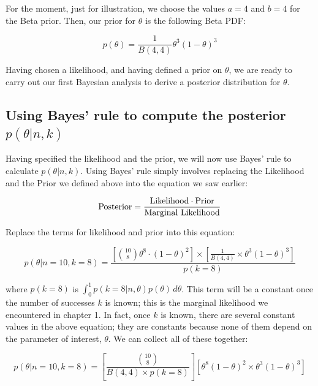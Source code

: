 \documentclass[12pt,]{krantz}
\theoremstyle{definition}
\theoremstyle{definition}
\theoremstyle{definition}
\theoremstyle{remark}
\begin{document}
For the moment, just for illustration, we choose the values \(a=4\) and \(b=4\) for the Beta prior. Then, our prior for \(\theta\) is the following Beta PDF:

\begin{equation}
p(\theta) = \frac{1}{B(4,4)} \theta^{3} (1-\theta)^{3}
\end{equation}

Having chosen a likelihood, and having defined a prior on \(\theta\), we are ready to carry out our first Bayesian analysis to derive a posterior distribution for \(\theta\).

\hypertarget{using-bayes-rule-to-compute-the-posterior-pthetank}{%
\subsection{\texorpdfstring{Using Bayes' rule to compute the posterior \(p(\theta|n,k)\)}{Using Bayes' rule to compute the posterior p(\textbackslash{}theta\textbar{}n,k)}}\label{using-bayes-rule-to-compute-the-posterior-pthetank}}

Having specified the likelihood and the prior, we will now use Bayes' rule to calculate \(p(\theta|n,k)\). Using Bayes' rule simply involves replacing the Likelihood and the Prior we defined above into the equation we saw earlier:

\begin{equation}
\hbox{Posterior} = \frac{\hbox{Likelihood} \cdot \hbox{Prior}}{\hbox{Marginal Likelihood}}
\end{equation}

Replace the terms for likelihood and prior into this equation:

\begin{equation}
p(\theta|n=10,k=8) = \frac{\left[\binom{10}{8} \theta^8 \cdot (1-\theta)^{2}\right]  \times \left[\frac{1}{B(4,4)} \times \theta^{3} (1-\theta)^{3}\right]}{p(k=8)}
\label{eq:betaunpost}
\end{equation}

where \(p(k=8)\) is \(\int_{0}^1 p(k=8|n,\theta) p(\theta)\, d\theta\). This term will be a constant once the number of successes \(k\) is known; this is the marginal likelihood we encountered in chapter 1. In fact, once \(k\) is known, there are several constant values in the above equation; they are constants because none of them depend on the parameter of interest, \(\theta\). We can collect all of these together:

\begin{equation}
p(\theta|n=10,k=8) =   \left[ \frac{\binom{10}{8}}{B(4,4)\times p(k=8)} \right]   [\theta^8 (1-\theta)^{2} \times  \theta^{3} (1-\theta)^{3}]
\label{eq:betaunpost2}
\end{equation}
\end{document}
